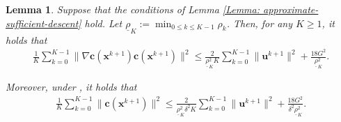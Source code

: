 \documentclass{article}
\theoremstyle{plain}
\newtheorem{lemma}{Lemma}[section]
\theoremstyle{definition}
\theoremstyle{remark}
\newcommand{\bx}{\bm{x}}
\newcommand{\bc}{\bm{c}}
\newcommand{\bu}{\bm{u}}
\newcommand{\sumK}{\sum_{k=0}^{K-1}}
\numberwithin{equation}{section}
\begin{document}
\begin{lemma}
    \label{Lemma: the error bound of infeasible stationarity and kkt conditions}
    Suppose
    that the conditions of Lemma \ref{Lemma: approximate-sufficient-descent}
    hold. Let $\underline{\rho}_K:=\min_{0\leq k\leq K-1}\rho_k$. Then, for any $K \geq 1$, it holds that
    \begin{align}
        \label{Eq: the bound of infeasible stationarity-averaging}\frac{1}{K}\sum_{k=0}^{K-1}\| \nabla \bc(\bx^{k+1}) \bc(\bx^{k+1}) \|^{2}\leq \frac{2}{\underline{\rho}_K^{2}K}\sum_{k=0}^{K-1}\| \bu^{k+1}\|^{2}+ \frac{18 G^{2}}{\underline{\rho}_K^{2}}.
    \end{align}

    Moreover, under , it holds that
    \begin{align}
        \label{Eq: the constraint violation-averaging}
        \frac{1}{K}\sumK \| \bc(\bx^{k+1}) \|^{2}\leq \frac{2}{\underline{\rho}_K^{2}\delta^{2}K}\sumK \| \bu^{k+1}\|^{2}+ \frac{18 G^{2}}{\delta^{2}\underline{\rho}_K^{2}}.
    \end{align}
\end{lemma}
\end{document}
